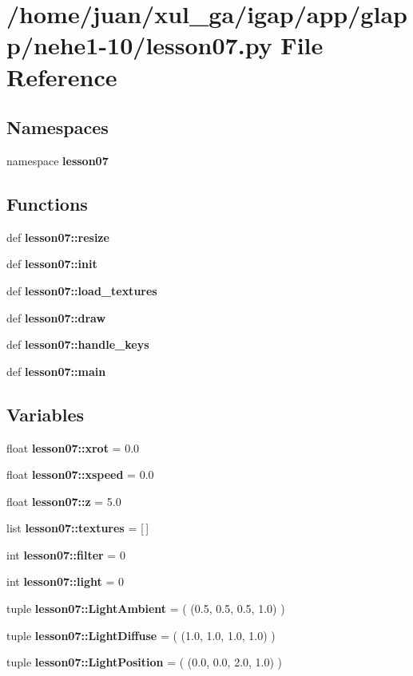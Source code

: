 \section{/home/juan/xul\_\-ga/igap/app/glapp/nehe1-10/lesson07.py File Reference}
\label{nehe1-10_2lesson07_8py}
\subsection*{Namespaces}
\begin{CompactItemize}
\item 
namespace {\bf lesson07}
\end{CompactItemize}
\subsection*{Functions}
\begin{CompactItemize}
\item 
def {\bf lesson07::resize}
\item 
def {\bf lesson07::init}
\item 
def {\bf lesson07::load\_\-textures}
\item 
def {\bf lesson07::draw}
\item 
def {\bf lesson07::handle\_\-keys}
\item 
def {\bf lesson07::main}
\end{CompactItemize}
\subsection*{Variables}
\begin{CompactItemize}
\item 
float {\bf lesson07::xrot} = 0.0
\item 
float {\bf lesson07::xspeed} = 0.0
\item 
float {\bf lesson07::z} = 5.0
\item 
list {\bf lesson07::textures} = [$\,$]
\item 
int {\bf lesson07::filter} = 0
\item 
int {\bf lesson07::light} = 0
\item 
tuple {\bf lesson07::LightAmbient} = ( (0.5, 0.5, 0.5, 1.0) )
\item 
tuple {\bf lesson07::LightDiffuse} = ( (1.0, 1.0, 1.0, 1.0) )
\item 
tuple {\bf lesson07::LightPosition} = ( (0.0, 0.0, 2.0, 1.0) )
\end{CompactItemize}
